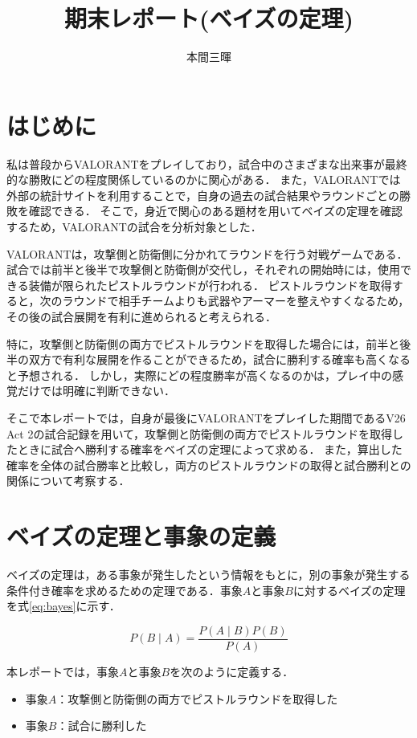 \documentclass[titlepage,a4paper]{jsarticle}
\title{期末レポート(ベイズの定理)}
\author{本間三暉}
\begin{document}
\maketitle
\section{はじめに}

私は普段からVALORANTをプレイしており，試合中のさまざまな出来事が最終的な勝敗にどの程度関係しているのかに関心がある．
また，VALORANTでは外部の統計サイトを利用することで，自身の過去の試合結果やラウンドごとの勝敗を確認できる．
そこで，身近で関心のある題材を用いてベイズの定理を確認するため，VALORANTの試合を分析対象とした．

VALORANTは，攻撃側と防衛側に分かれてラウンドを行う対戦ゲームである．
試合では前半と後半で攻撃側と防衛側が交代し，それぞれの開始時には，使用できる装備が限られたピストルラウンドが行われる．
ピストルラウンドを取得すると，次のラウンドで相手チームよりも武器やアーマーを整えやすくなるため，その後の試合展開を有利に進められると考えられる．

特に，攻撃側と防衛側の両方でピストルラウンドを取得した場合には，前半と後半の双方で有利な展開を作ることができるため，試合に勝利する確率も高くなると予想される．
しかし，実際にどの程度勝率が高くなるのかは，プレイ中の感覚だけでは明確に判断できない．

そこで本レポートでは，自身が最後にVALORANTをプレイした期間であるV26 Act 2の試合記録を用いて，攻撃側と防衛側の両方でピストルラウンドを取得したときに試合へ勝利する確率をベイズの定理によって求める．
また，算出した確率を全体の試合勝率と比較し，両方のピストルラウンドの取得と試合勝利との関係について考察する．


\section{ベイズの定理と事象の定義}

ベイズの定理は，ある事象が発生したという情報をもとに，別の事象が発生する条件付き確率を求めるための定理である．事象$A$と事象$B$に対するベイズの定理を式\eqref{eq:bayes}に示す．

\begin{equation}
  P(B \mid A)
  =
  \frac{P(A \mid B)P(B)}{P(A)}
  \label{eq:bayes}
\end{equation}

本レポートでは，事象$A$と事象$B$を次のように定義する．

\begin{itemize}
  \item 事象$A$：攻撃側と防衛側の両方でピストルラウンドを取得した
  \item 事象$B$：試合に勝利した
\end{itemize}
\end{document}
